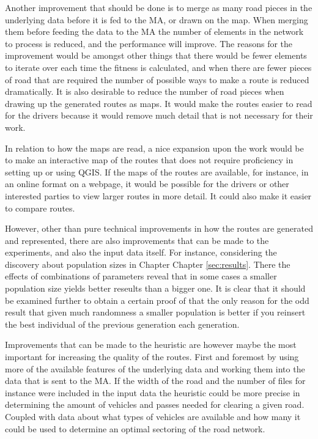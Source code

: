 Another improvement that should be done is to merge as many road pieces in the underlying data before it is fed to the MA, or drawn on the map. When merging them before feeding the data to the MA the number of elements in the network to process is reduced, and the performance will improve. The reasons for the improvement would be amongst other things that there would be fewer elements to iterate over each time the fitness is calculated, and when there are fewer pieces of road that are required the number of possible ways to make a route is reduced dramatically. It is also desirable to reduce the number of road pieces when drawing up the generated routes as maps. It would make the routes easier to read for the drivers because it would remove much detail that is not necessary for their work.

In relation to how the maps are read, a nice expansion upon the work would be to make an interactive map of the routes that does not require proficiency in setting up or using QGIS. If the maps of the routes are available, for instance, in an online format on a webpage, it would be possible for the drivers or other interested parties to view larger routes in more detail. It could also make it easier to compare routes.

However, other than pure technical improvements in how the routes are generated and represented, there are also improvements that can be made to the experiments, and also the input data itself. 
For instance, considering the discovery about population sizes in Chapter Chapter \ref{sec:results}. There the effects of combinations of parameters reveal that in some cases a smaller population size yields better reseults than a bigger one. It is clear that it should be examined further to obtain a certain proof of that the only reason for the odd result that given much randomness a smaller population is better if you reinsert the best individual of the previous generation each generation.

Improvements that can be made to the heuristic are however maybe the most important for increasing the quality of the routes. First and foremost by using more of the available features of the underlying data and working them into the data that is sent to the MA. If the width of the road and the number of files for instance were included in the input data the heuristic could be more precise in determining the amount of vehicles and passes needed for clearing a given road. Coupled with data about what types of vehicles are available and how many it could be used to determine an optimal sectoring of the road network.

